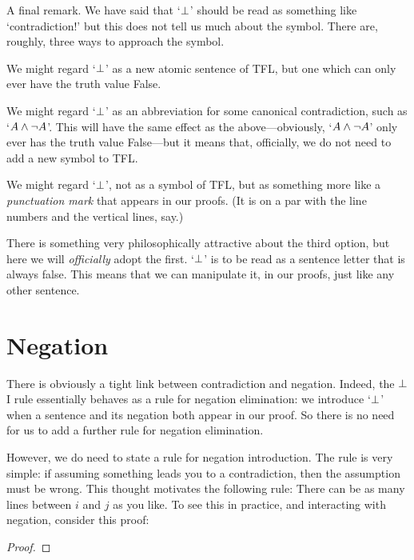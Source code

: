A final remark. We have said that `$\bot$' should be read as something like `contradiction!' but this does not tell us much about the symbol. There are, roughly, three ways to approach the symbol. 
	\begin{ebullet}
		\item We might regard `$\bot$' as a new atomic sentence of TFL, but one which can only ever have the truth value False. 
		\item We might regard `$\bot$' as an abbreviation for some canonical contradiction, such as `$A \wedge \neg A$'. This will have the same effect as the above---obviously, `$A \wedge \neg A$' only ever has the truth value False---but it means that, officially, we do not need to add a new symbol to TFL.
		\item We might regard `$\bot$', not as a symbol of TFL, but as something more like a \emph{punctuation mark} that appears in our proofs. (It is on a par with the line numbers and the vertical lines, say.)
	\end{ebullet}
There is something very philosophically attractive about the third option, but here we will \emph{officially} adopt the first. `$\bot$' is to be read as a sentence letter that is always false. This means that we can manipulate it, in our proofs, just like any other sentence.


\section{Negation}
There is obviously a tight link between contradiction and negation. Indeed, the $\bot$I rule essentially behaves as a rule for negation elimination: we introduce `$\bot$' when a sentence and its negation both appear in our proof. So there is no need for us to add a further rule for negation elimination.

However, we do need to state a rule for negation introduction. The rule is very simple: if assuming something leads you to a contradiction, then the assumption must be wrong. This thought motivates the following rule:
There can be as many lines between $i$ and $j$ as you like. To see this in practice, and interacting with negation, consider this proof:
	\begin{proof}
		\open
		\close
	\end{proof}


